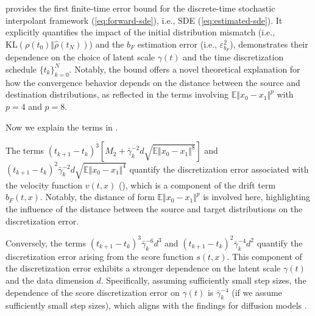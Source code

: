  provides the first finite-time error bound for the  discrete-time stochastic interpolant framework (\ref{eq:forward-sde}), i.e., SDE (\ref{eq:estimated-sde}). It explicitly quantifies the impact of the initial distribution mismatch (i.e., $\text{KL}(\rho(t_0)\Vert\hat{\rho}(t_N))$) and the $b_F$ estimation error (i.e.,  $\varepsilon_{b_F}^2$), demonstrates their dependence on the choice of latent scale $\gamma(t)$ and the time discretization schedule $\{t_k\}_{k=0}^N$. Notably, the bound offers a novel theoretical explanation for how the convergence behavior depends on the distance between the source and destination distributions, as reflected in the terms involving $\mathbb{E}\Vert x_0-x_1\Vert^p$ with $p=4$ and $p=8$.

Now we explain the terms in .

The terms $(t_{k+1}-t_k)^3\left[M_2+\bar{\gamma}_k^{-2}d\sqrt{\mathbb{E}\Vert x_0-x_1\Vert^8}\right]$ and $(t_{k+1}-t_k)^2\bar{\gamma}_k^{-2}d\sqrt{\mathbb{E}\Vert x_0-x_1\Vert^4}$ quantify the discretization error associated with the velocity function $v(t,x)$ (), which is a component of the drift term $b_F(t,x)$. Notably, the distance of form $\mathbb{E}\Vert x_0-x_1\Vert^p$ is involved here, highlighting the influence of the distance between the source and target distributions on the discretization error. 

Conversely, the terms $(t_{k+1}-t_k)^3\bar{\gamma}_k^{-6}d^3$ and $(t_{k+1}-t_k)^2\bar{\gamma}_k^{-4}d^2$ quantify the discretization error arising from the score function $s(t,x)$. This component of the discretization error exhibits a stronger dependence on the latent scale $\gamma(t)$ and the data dimension $d$. Specifically, assuming sufficiently small step sizes, the dependence of the score discretization error on $\gamma(t)$ is $\bar{\gamma}_k^{-4}$ (if we assume sufficiently small step sizes), which aligns with the findings for diffusion models \cite{chen2023improved, dlinear}.

